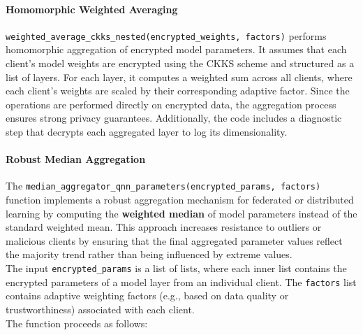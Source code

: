\documentclass[10pt]{article}
\begin{document}
\paragraph{Homomorphic Weighted Averaging}
\texttt{weighted\_average\_ckks\_nested(encrypted\_weights, factors)} performs homomorphic aggregation of encrypted model parameters. It assumes that each client's model weights are encrypted using the CKKS scheme and structured as a list of layers. For each layer, it computes a weighted sum across all clients, where each client's weights are scaled by their corresponding adaptive factor. Since the operations are performed directly on encrypted data, the aggregation process ensures strong privacy guarantees. Additionally, the code includes a diagnostic step that decrypts each aggregated layer to log its dimensionality.
\paragraph{Robust Median Aggregation}
The \texttt{median\_aggregator\_qnn\_parameters(encrypted\_params, factors)} function implements a robust aggregation mechanism for federated or distributed learning by computing the \textbf{weighted median} of model parameters instead of the standard weighted mean. This approach increases resistance to outliers or malicious clients by ensuring that the final aggregated parameter values reflect the majority trend rather than being influenced by extreme values.\\
The input \texttt{encrypted\_params} is a list of lists, where each inner list contains the encrypted parameters of a model layer from an individual client. The \texttt{factors} list contains adaptive weighting factors (e.g., based on data quality or trustworthiness) associated with each client.\\
The function proceeds as follows:
\end{document}
